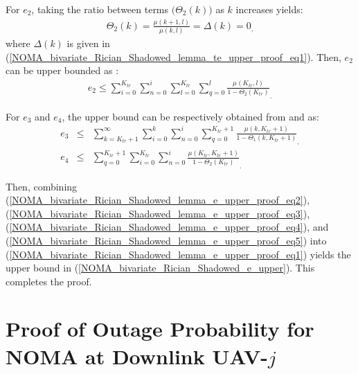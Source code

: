 For $e_2$, taking the ratio between terms $\big(\Theta_2(k)\big)$ as $k$ increases yields: 
\begin{eqnarray}
\Theta_2(k) = \frac{\mu(k+1,l)}{\mu(k,l)} = \Delta(k) = 0_, \nonumber
\end{eqnarray}
where $\Delta(k)$ is given in (\ref{NOMA_bivariate_Rician_Shadowed_lemma_te_upper_proof_eq1}). Then, $e_2$ can be upper bounded as \cite[eq. (92)]{o2011product}:
\begin{eqnarray} 
e_2 \leq \sum_{i=0}^{K_{tr}} \sum_{n=0}^{i} \sum_{l=0}^{K_{tr}} \sum_{q=0}^{l} {\frac{\mu(K_{tr},l)}{1-\Theta_2(K_{tr})}}_. \label{NOMA_bivariate_Rician_Shadowed_lemma_e_upper_proof_eq3}
\end{eqnarray}

For $e_3$ and $e_4$, the upper bound can be respectively obtained from \cite[eq. (93)]{o2011product} and \cite[eq. (102)]{o2011product} as:
\begin{eqnarray} 
e_3 & \leq & \sum_{k=K_{tr}+1}^{\infty} \sum_{i=0}^{k} \sum_{n=0}^{i} \sum_{q=0}^{K_{tr}+1} {\frac{\mu(k,K_{tr}+1)}{1-\Theta_1(k,K_{tr}+1)}}_, \label{NOMA_bivariate_Rician_Shadowed_lemma_e_upper_proof_eq4} \\
e_4 & \leq & \sum_{q=0}^{K_{tr}+1} \sum_{i=0}^{K_{tr}} \sum_{n=0}^{i} {\frac{\mu(K_{tr},K_{tr}+1)}{1-\Theta_2(K_{tr})}}_. \label{NOMA_bivariate_Rician_Shadowed_lemma_e_upper_proof_eq5}
\end{eqnarray}

Then, combining (\ref{NOMA_bivariate_Rician_Shadowed_lemma_e_upper_proof_eq2}), (\ref{NOMA_bivariate_Rician_Shadowed_lemma_e_upper_proof_eq3}), (\ref{NOMA_bivariate_Rician_Shadowed_lemma_e_upper_proof_eq4}), and (\ref{NOMA_bivariate_Rician_Shadowed_lemma_e_upper_proof_eq5}) into (\ref{NOMA_bivariate_Rician_Shadowed_lemma_e_upper_proof_eq1}) yields the upper bound in (\ref{NOMA_bivariate_Rician_Shadowed_e_upper}). This completes the proof. 

\section{Proof of Outage Probability for NOMA at Downlink UAV-$j$} \label{NOMA_bivariate_Rician_Shadowed_theorem_P_out_down_uav_proof}

